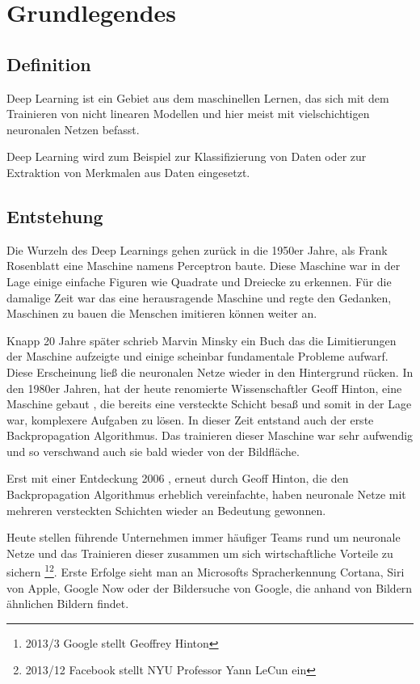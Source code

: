 \chapter{Grundlegendes}
\label{cha:grundlegendes}

\section{Definition}

Deep Learning ist ein Gebiet aus dem maschinellen Lernen, das sich mit dem Trainieren von nicht linearen Modellen und hier meist mit vielschichtigen neuronalen Netzen befasst. 

Deep Learning wird zum Beispiel zur Klassifizierung von Daten oder zur Extraktion von Merkmalen aus Daten eingesetzt.

\section{Entstehung}
\label{cha:entstehung}

Die Wurzeln des Deep Learnings gehen zurück in die 1950er Jahre, als Frank Rosenblatt eine Maschine namens Perceptron \citep{Perceptron} baute. Diese Maschine war in der Lage einige einfache Figuren wie Quadrate und Dreiecke zu erkennen. Für die damalige Zeit war das eine herausragende Maschine und regte den Gedanken, Maschinen zu bauen die Menschen imitieren können weiter an.

Knapp 20 Jahre später schrieb Marvin Minsky \citep{PerceptronsMinsky} ein Buch das die Limitierungen der Maschine aufzeigte und einige scheinbar fundamentale Probleme aufwarf. Diese Erscheinung ließ die neuronalen Netze wieder in den Hintergrund rücken.
In den 1980er Jahren, hat der heute renomierte Wissenschaftler Geoff Hinton, eine Maschine gebaut \citep{BackpropagationEarly}, die bereits eine versteckte Schicht besaß und somit in der Lage war, komplexere Aufgaben zu lösen. In dieser Zeit entstand auch der erste Backpropagation Algorithmus. %
Das trainieren dieser Maschine war sehr aufwendig und so verschwand auch sie bald wieder von der Bildfläche. 

Erst mit einer Entdeckung 2006 \citep{BackpropagationFast}, erneut durch Geoff Hinton, die den Backpropagation Algorithmus erheblich vereinfachte, haben neuronale Netze mit mehreren versteckten Schichten wieder an Bedeutung gewonnen. 

Heute stellen führende Unternehmen immer häufiger Teams rund um neuronale Netze und das Trainieren dieser zusammen um sich wirtschaftliche Vorteile zu sichern \footnote{2013/3 Google stellt Geoffrey Hinton}\footnote{2013/12 Facebook stellt NYU Professor Yann LeCun ein}. Erste Erfolge sieht man an Microsofts Spracherkennung Cortana, Siri von Apple, Google Now oder der Bildersuche von Google, die anhand von Bildern ähnlichen Bildern findet.



